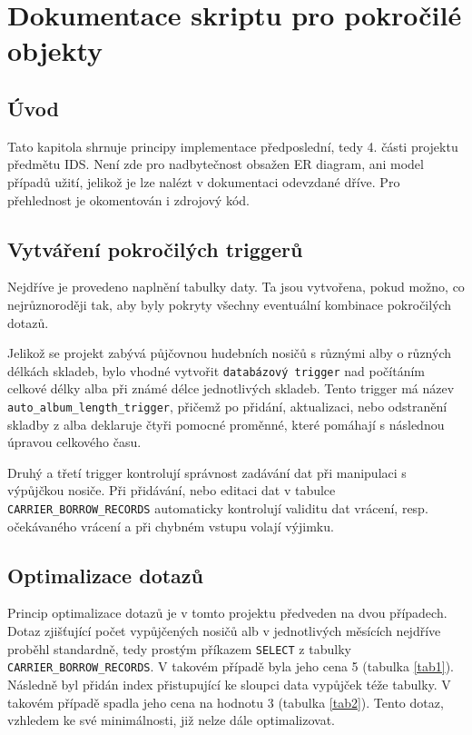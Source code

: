 \section{Dokumentace skriptu pro pokročilé objekty}
\subsection{Úvod}
Tato kapitola shrnuje principy implementace předposlední, tedy 4. části projektu předmětu IDS. Není zde pro nadbytečnost obsažen ER diagram, ani model případů užití, jelikož je lze nalézt v dokumentaci odevzdané dříve. Pro přehlednost je okomentován i zdrojový kód.

\subsection{Vytváření pokročilých triggerů}
Nejdříve je provedeno naplnění tabulky daty. Ta jsou vytvořena, pokud možno, co nejrůznoroději tak, aby byly pokryty všechny eventuální kombinace pokročilých dotazů.

Jelikož se projekt zabývá půjčovnou hudebních nosičů s různými alby o různých délkách skladeb, bylo vhodné vytvořit \texttt{databázový trigger} nad počítáním celkové délky alba při známé délce jednotlivých skladeb. Tento trigger má název \texttt{auto\_album\_length\_trigger}, přičemž po přidání, aktualizaci, nebo odstranění skladby z alba deklaruje čtyři pomocné proměnné, které pomáhají s následnou úpravou celkového času.

Druhý a třetí trigger kontrolují správnost zadávání dat při manipulaci s výpůjčkou nosiče. Při přidávání, nebo editaci dat v tabulce \texttt{CARRIER\_BORROW\_RECORDS} automaticky kontrolují validitu dat vrácení, resp. očekávaného vrácení a při chybném vstupu volají výjimku.




\subsection{Optimalizace dotazů}
Princip optimalizace dotazů je v tomto projektu předveden na dvou případech. Dotaz zjišťující počet vypůjčených nosičů alb v jednotlivých měsících nejdříve proběhl standardně, tedy prostým příkazem \texttt{SELECT} z tabulky \texttt{CARRIER\_BORROW\_RECORDS}. V takovém případě byla jeho cena 5 (tabulka \ref{tab1}). Následně byl přidán index přistupující ke sloupci data vypůjček téže tabulky. V takovém případě spadla jeho cena na hodnotu 3 (tabulka \ref{tab2}). Tento dotaz, vzhledem ke své minimálnosti, již nelze dále optimalizovat.

